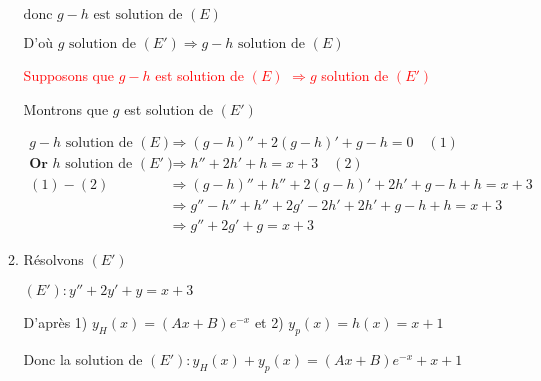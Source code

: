 \documentclass[12pt,a4paper]{article}
\begin{document}
\begin{enumerate}
\begin{enumerate}
        \(\text{donc } g - h \text{ est solution de } (E)\)

        \(\text{D'où } g \text{ solution de } (E') \Rightarrow g - h \text{ solution de } (E)\)

        \textcolor{red}{\textasteriskcentered{} Supposons que \( g - h \) est solution de \((E)\) \( \Rightarrow g \) solution de \((E')\)}

Montrons que \( g \) est solution de \((E') \)

\(        
\begin{aligned}
            g - h \text{ solution de } (E) &\Rightarrow (g - h)'' + 2(g - h)' + g - h = 0 \quad(1)\\
             \textbf{Or } h  \text{ solution de } (E') &\Rightarrow h'' + 2h' + h = x + 3 \quad(2)\\
(1) - (2)       &\Rightarrow (g - h)'' + h'' + 2(g - h)' + 2h' + g - h + h = x + 3\\
                &\Rightarrow g'' - h'' + h'' + 2g' - 2h' + 2h' + g - h + h = x + 3\\
                &\Rightarrow g'' + 2g' + g = x + 3
\end{aligned}
\)

\item Résolvons \( (E') \)

\( (E'): y'' + 2y' + y = x + 3 \)

D'après 1) \( y_{H}(x) = (Ax+B)e^{-x} \) et 2) \( y_{p}(x)=h(x) = x+1 \)

Donc la solution de \( (E'): y_{H}(x)+y_{p}(x) = (Ax+B)e^{-x} + x+1\)

     \end{enumerate}
\end{enumerate}
\end{document}
